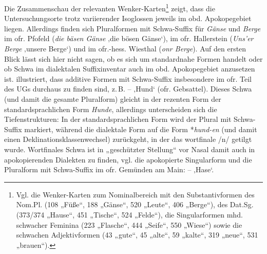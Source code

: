 Die Zusammenschau der relevanten Wenker-Karten\footnote{Vgl. die Wenker-Karten zum Nominalbereich mit den Substantivformen des Nom.Pl. (108 „Füße“, 188 „Gänse“, 520 „Leute“, 406 „Berge“), des Dat.Sg. (373/374 „Hause“, 451 „Tische“, 524 „Felde“), die Singularformen mhd. schwacher Feminina (223 „Flasche“, 444 „Seife“, 550 „Wiese“) sowie die schwachen Adjektivformen (43 „gute“, 45 „alte“, 59 „kalte“, 319 „neue“, 531 „brauen“).} zeigt, dass die Untersuchungsorte trotz variierender Isoglossen jeweils im obd. Apokopegebiet liegen. Allerdings finden sich Pluralformen mit Schwa-Suffix für \textit{Gänse} und \textit{Berge} im ofr. Pfofeld (\textit{die bäsen Gänse} ‚die bösen Gänse‘), im ofr. Hallerstein (\textit{Uns’er Berge} ‚unsere Berge‘) und im ofr.-hess. Wiesthal (\textit{onr Berge}). Auf den ersten Blick lässt sich hier nicht sagen, ob es sich um standardnahe Formen handelt oder ob Schwa im dialektalen Suffixinventar auch im obd. Apokopegebiet anzusetzen ist.  illustriert, dass additive Formen mit Schwa-Suffix insbesondere im ofr. Teil des UGs durchaus zu finden sind, z.\,B.  --  ‚Hund‘ (ofr. Gebsattel). Dieses Schwa (und damit die gesamte Pluralform) gleicht in der rezenten Form der standardsprachlichen Form \textit{Hunde}, allerdings unterscheiden sich die Tiefenstrukturen: In der standardsprachlichen Form wird der Plural mit Schwa-Suffix markiert, während die dialektale Form auf die Form *\textit{hund-en} (und damit einen Deklinationsklassenwechsel) zurückgeht, in der das wortfinale /n/ getilgt wurde. Wortfinales Schwa ist in „geschützter Stellung“ \citep[203]{Birkenes2014} vor Nasal damit auch in apokopierenden Dialekten zu finden, vgl. die apokopierte Singularform und die Pluralform mit Schwa-Suffix im ofr. Gemünden am Main:  --  ‚Hase‘.

